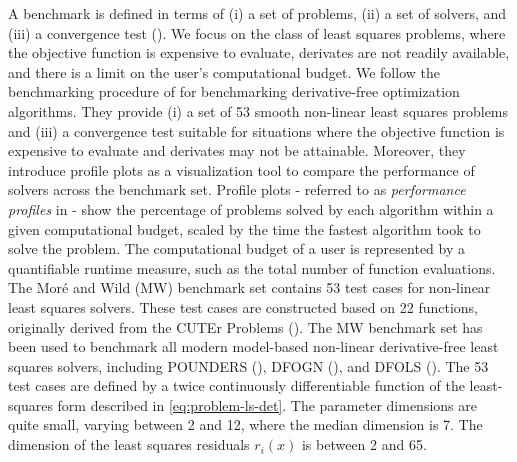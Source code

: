 \noindent A benchmark is defined in terms of (i) a set of problems, (ii) a set of solvers, and
(iii) a convergence test (\cite{Dolan2002}). We focus on the class of least squares problems, where the objective function is expensive to evaluate, derivates are not readily available, and there is a limit on the user's computational budget.
We follow the benchmarking procedure of \cite{MoreWild2009} for benchmarking derivative-free optimization algorithms. They provide (i) a set of 53 smooth non-linear least squares problems and (iii) a convergence test suitable for situations where the objective function is expensive to evaluate and derivates may not be attainable.
Moreover, they introduce profile plots as a visualization tool to compare the performance of solvers across the benchmark set.
Profile plots - referred to as \textit{performance profiles} in \cite{MoreWild2009} - show the percentage of problems solved by each algorithm within a given computational budget, scaled by the time the fastest algorithm took to solve the problem. The computational budget of a user is represented by a quantifiable runtime measure, such as the total number of function evaluations.
The Moré and Wild (MW) benchmark set contains 53 test cases for non-linear least squares solvers.
These test cases are constructed based on 22 functions, originally derived from the CUTEr
Problems (\cite{Gould2003}). The MW benchmark set has been used to benchmark all modern model-based non-linear derivative-free least squares solvers, including POUNDERS (\cite{Wild2015}), DFOGN (\cite{Cartis2017}), and DFOLS (\cite{Cartis2019}). The 53 test cases are defined by a twice continuously differentiable function of the least-squares form described in \ref{eq:problem-ls-det}. The parameter dimensions are quite small, varying between 2 and 12, where the median dimension is 7.
The dimension of the least squares residuals $r_i(x)$ is between 2 and 65.



